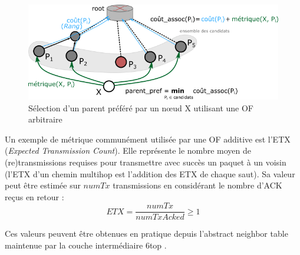 \documentclass[]{report}
\begin{document}
	\begin{figure}[!h]
	\centering
	\includegraphics[width=0.85\linewidth]{OF_sel_parent}
	\caption{Sélection d'un parent préféré par un nœud X utilisant une OF arbitraire}
	\label{fig:OF}
	\end{figure}

\par Un exemple de métrique communément utilisée par une OF additive est l'ETX (\textit{Expected Transmission Count}). Elle représente le nombre moyen de (re)transmissions requises pour transmettre avec succès un paquet à un voisin (l'ETX d'un chemin multihop est l'addition des ETX de chaque saut). Sa valeur peut être estimée sur $numTx$ transmissions en considérant le nombre d'ACK reçus en retour : 
\begin{equation}
ETX = \frac{numTx}{numTxAcked} \geq 1
\end{equation}

\noindent Ces valeurs peuvent être obtenues en pratique depuis l'abstract neighbor table maintenue par la couche intermédiaire 6top \cite{ietf-6tisch-architecture-28}.

\newpage
\end{document}
